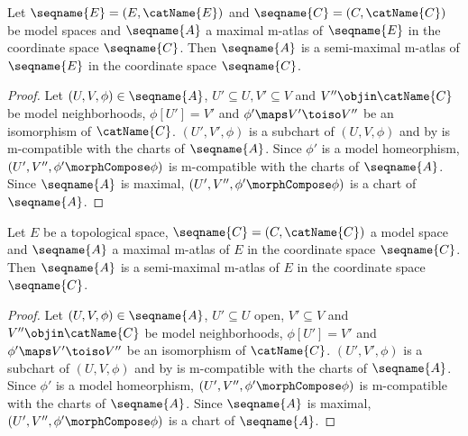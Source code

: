 \documentclass{article}
\begin{document}
\begin{lemma}
\label{lem:M-ATLmax}
Let $\seqname{E}=(E, \catName{E})$ and $\seqname{C}=(C,\catName{C})$ be
model spaces and $\seqname{A}$ a maximal m-atlas of $\seqname{E}$ in the
coordinate space $\seqname{C}$. Then $\seqname{A}$ is a semi-maximal
m-atlas of $\seqname{E}$ in the coordinate space $\seqname{C}$.

\begin{proof}
Let $(U,V,\phi) \in \seqname{A}$, $U' \subseteq U, V' \subseteq V$
and $V'' \objin \catName{C}$ be model neighborhoods, $\phi[U'] = V'$ and
$\phi' \maps V' \toiso V''$ be an isomorphism of $\catName{C}$.
$(U', V', \phi)$ is a subchart of $(U,V,\phi)$ and by
 is m-compatible with the charts of
$\seqname{A}$.  Since $\phi'$ is a model homeorphism,
$(U', V'', \phi' \morphCompose \phi)$ is m-compatible with the charts of
$\seqname{A}$.  Since $\seqname{A}$ is maximal,
$(U', V'', \phi' \morphCompose \phi)$ is a chart of $\seqname{A}$.
\end{proof}

Let $E$ be a topological space, $\seqname{C}=(C,\catName{C})$ a model
space and $\seqname{A}$ a maximal m-atlas of $E$ in the coordinate space
$\seqname{C}$. Then $\seqname{A}$ is a semi-maximal m-atlas of $E$ in
the coordinate space $\seqname{C}$.

\begin{proof}
Let $(U,V,\phi) \in \seqname{A}$, $U' \subseteq U$ open, $V' \subseteq V$
and $V'' \objin \catName{C}$ be model neighborhoods, $\phi[U'] = V'$ and
$\phi' \maps V' \toiso V''$ be an isomorphism of $\catName{C}$.
$(U', V', \phi)$ is a subchart of $(U,V,\phi)$ and by
 is m-compatible with the charts of
$\seqname{A}$.  Since $\phi'$ is a model homeorphism,
$(U', V'', \phi' \morphCompose \phi)$ is m-compatible with the charts of
$\seqname{A}$.  Since $\seqname{A}$ is maximal,
$(U', V'', \phi' \morphCompose \phi)$ is a chart of $\seqname{A}$.
\end{proof}
\end{lemma}
\end{document}
